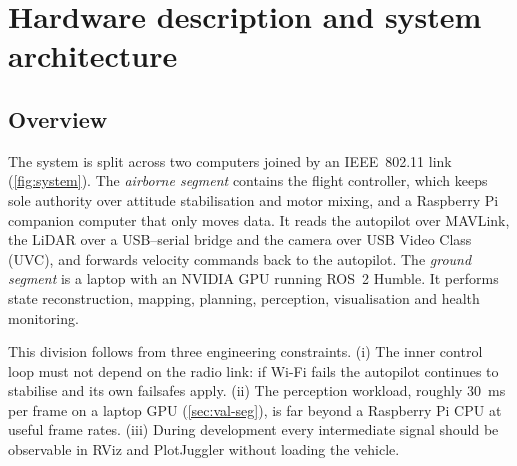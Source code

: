 \section{Hardware description and system architecture}
\label{sec:arch}

\subsection{Overview}

The system is split across two computers joined by an IEEE~802.11 link
(\cref{fig:system}). The \emph{airborne segment} contains the flight controller, which
keeps sole authority over attitude stabilisation and motor mixing, and a Raspberry Pi
companion computer that only moves data. It reads the autopilot over MAVLink, the
LiDAR over a USB--serial bridge and the camera over USB Video Class (UVC), and
forwards velocity commands back to the autopilot. The \emph{ground segment} is a
laptop with an NVIDIA GPU running ROS~2 Humble. It performs state reconstruction,
mapping, planning, perception, visualisation and health monitoring.

This division follows from three engineering constraints. (i) The inner control loop
must not depend on the radio link: if Wi-Fi fails the autopilot continues to stabilise
and its own failsafes apply. (ii) The perception workload, roughly \SI{30}{\milli\second}
per frame on a laptop GPU (\cref{sec:val-seg}), is far beyond a Raspberry Pi CPU at
useful frame rates. (iii) During development every intermediate signal should be
observable in RViz and PlotJuggler without loading the vehicle.


